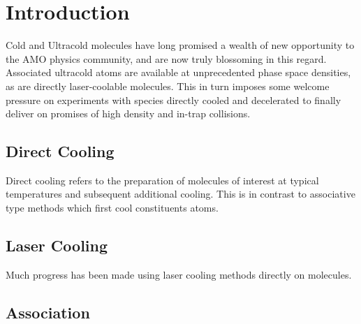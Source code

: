 \ifx\justbeingincluded\undefined

\fi

\chapter{Introduction}
\label{iii}

Cold and Ultracold molecules have long promised a wealth of new opportunity to the AMO physics community, and are now truly blossoming in this regard. Associated ultracold atoms are available at unprecedented phase space densities, as are directly laser-coolable molecules. This in turn imposes some welcome pressure on experiments with species directly cooled and decelerated to finally deliver on promises of high density and in-trap collisions.

\section{Direct Cooling}

Direct cooling refers to the preparation of molecules of interest at typical temperatures and subsequent additional cooling. This is in contrast to associative type methods which first cool constituents atoms.

\section{Laser Cooling}

Much progress has been made using laser cooling methods directly on molecules.

\section{Association}




\ifx\justbeingincluded\undefined

\fi

